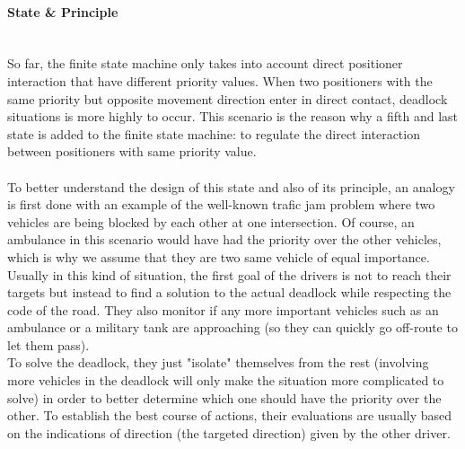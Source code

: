 \documentclass[]{spie}  %
\begin{document}
	\paragraph{State \& Principle}\mbox{}\\
	So far, the finite state machine only takes into account direct positioner interaction that have different priority values.
	When two positioners with the same priority but opposite movement direction enter in direct contact, deadlock situations is more highly to occur. This scenario is the reason why a fifth and last state is added to the finite state machine: to regulate the direct interaction between positioners with same priority value.\\\\	
	To better understand the design of this state and also of its principle, an analogy is first done with an example of the well-known trafic jam problem where two vehicles are being blocked by each other at one intersection. Of course, an ambulance in this scenario would have had the priority over the other vehicles, which is why we assume that they are two same vehicle of equal importance.\\
	Usually in this kind of situation, the first goal of the drivers is not to reach their targets but instead to find a solution to the actual deadlock while respecting the code of the road. They also monitor if any more important vehicles such as an ambulance or a military tank are approaching (so they can quickly go off-route to let them pass).\\ 
	To solve the deadlock, they just "isolate" themselves from the rest (involving more vehicles in the deadlock will only make the situation more complicated to solve)  in order to better determine which one should have the priority over the other. 
	To establish the best course of actions, their evaluations are usually based on the indications of direction (the targeted direction) given by the other driver.\\
	
\end{document}
